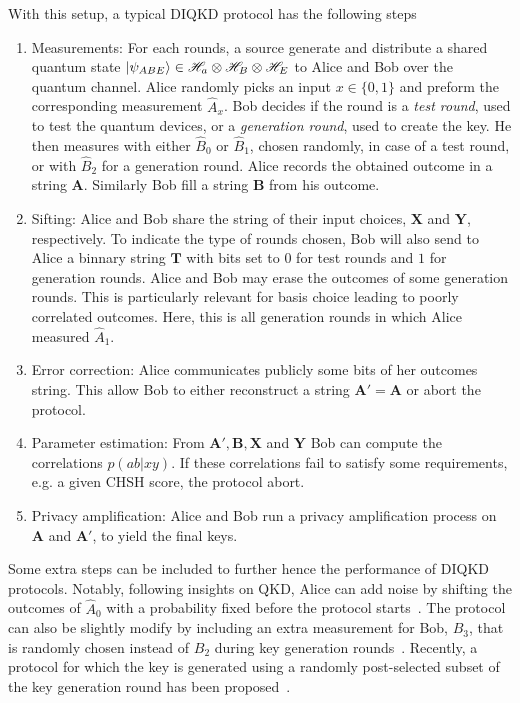 With this setup, a typical DIQKD protocol has the following steps
\begin{enumerate}
	\item Measurements: For each rounds, a source generate and distribute a shared quantum state $\ket{\psi_{ABE}} \in \mathscr{H}_a \otimes \mathscr{H}_B \otimes \mathscr{H}_E$ to Alice and Bob over the quantum channel. Alice randomly picks an input $x\in\{0,1\}$ and preform the corresponding measurement $\hat{A}_x$. 
		Bob decides if the round is a \textit{test round}, used to test the quantum devices, or a \textit{generation round}, used to create the key.
		He then measures with either $\hat{B}_0$ or $\hat{B}_1$, chosen randomly, in case of a test round, or with $\hat{B}_2$ for a generation round. 
		Alice records the obtained outcome in a string $\mathbf{A}$. 
		Similarly Bob fill a string $\mathbf{B}$ from his outcome. 
	\item Sifting: 
		Alice and Bob share the string of their input choices, $\mathbf{X}$ and $\mathbf{Y}$, respectively.
		To indicate the type of rounds chosen, Bob will also send to Alice a binnary string $\mathbf{T}$ with bits set to $0$ for test rounds and $1$ for generation rounds.  
		Alice and Bob may erase the outcomes of some generation rounds. 
		This is particularly relevant for basis choice leading to poorly correlated outcomes. 
		Here, this is all generation rounds in which Alice measured $\hat{A}_1$. 	
	\item Error correction: 
		Alice communicates publicly some bits of her outcomes string. 
		This allow Bob to either reconstruct a string $\mathbf{A'}=\mathbf{A}$ or abort the protocol.
	\item Parameter estimation:
		From $\mathbf{A'},\mathbf{B},\mathbf{X}$ and $\mathbf{Y}$ Bob can compute the correlations $p(ab|xy)$. 
		If these correlations fail to satisfy some requirements, e.g. a given CHSH score, the protocol abort. 
	\item Privacy amplification: 
		Alice and Bob run a privacy amplification process on $\mathbf{A}$ and $\mathbf{A'}$, to yield the final keys.
\end{enumerate}

Some extra steps can be included to further hence the performance of DIQKD protocols.
Notably, following insights on QKD, Alice can add noise by shifting the outcomes of $\hat{A}_0$ with a probability fixed before the protocol starts~\cite{Ho2020}. 
The protocol can also be slightly modify by including an extra measurement for Bob, $B_3$, that is randomly chosen instead of $B_2$ during key generation rounds~\cite{Schwonnek2021}. 
Recently, a protocol for which the key is generated using a randomly post-selected subset of the key generation round has been proposed~\cite{Xu2022}.

